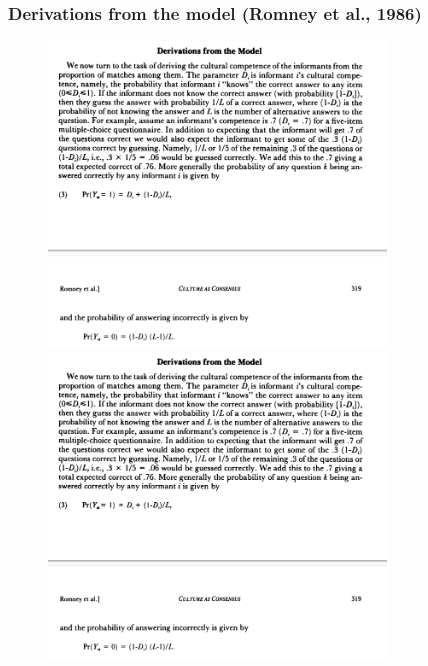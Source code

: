 \documentclass[aspectratio=169]{beamer}
\begin{document}
\begin{frame}
    \frametitle{Derivations from the model (Romney et al., 1986)}
    \begin{figure}
        \includegraphics[width=0.8\textwidth,trim=0 340 0 0,clip]{figures/romney.png}
        \includegraphics[width=0.8\textwidth,trim=0 0 0 620,clip]{figures/romney.png}
    \end{figure}
\end{frame}
\end{document}
